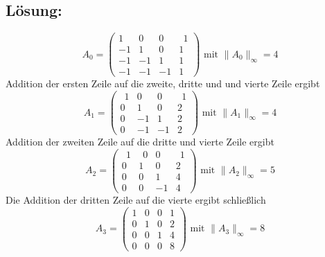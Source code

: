 \subsection*{Lösung:}
$$
A_0=\left(\begin{array}{rrrr} 1 & 0 & 0 & \ \ 1 \\ -1& 1 &0 &1 \\ -1 & -1 & 1 &1 \\ -1 & -1 &-1 &1 \end{array}\right)  \text{ mit } \|A_0\|_\infty = 4
$$
Addition der ersten Zeile auf die zweite, dritte und und vierte Zeile ergibt
$$
A_1=\left(\begin{array}{rrrr}  \ \ 1 & 0 & 0 & \ \ 1 \\ 0& 1 &0 &2 \\ 0 & -1 & 1 &2 \\ 0 & -1 &-1 &2 \end{array}\right)  \text{ mit } \|A_1\|_\infty = 4
$$
Addition der zweiten Zeile auf die dritte und vierte Zeile ergibt
$$
A_2=\left(\begin{array}{rrrr}  \ \ 1 & \ \ 0 & 0 & \ \ 1 \\ 0& 1 &0 &2 \\ 0 &0& 1 &4 \\ 0 &0 &-1 &4 \end{array}\right)   \text{ mit } \|A_2\|_\infty = 5
$$
Die Addition der dritten Zeile auf die vierte ergibt schließlich
$$
A_3=\left(\begin{array}{rrrr} 1 & 0 & 0 & 1 \\ 0& 1 &0 &2 \\ 0 &0& 1 &4 \\ 0 &0 &0 &8 \end{array}\right)   \text{ mit } \|A_3\|_\infty = 8
$$

